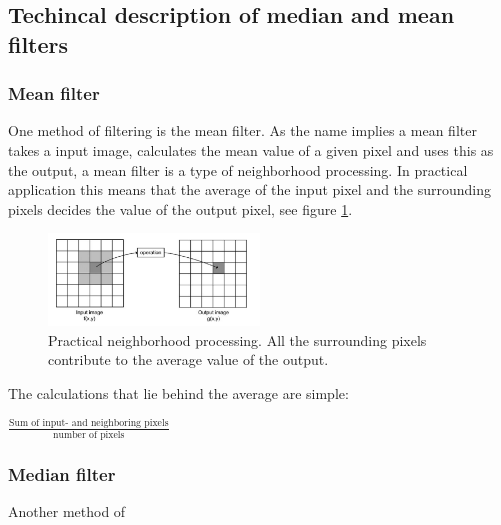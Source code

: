 \subsection{Techincal description of median and mean filters}

\subsubsection{Mean filter}
One method of filtering is the mean filter. As the name implies a mean filter takes a input image, calculates the mean value of a given pixel and uses this as the output, a mean filter is a type of neighborhood processing. In practical application this means that the average of the input pixel and the surrounding pixels decides the value of the output pixel, see figure \ref{fig:neigh_pros}.

\begin{figure}[htbp] 
\centering 
\includegraphics[width=0.5\textwidth]{Pictures/Theory/neighborhood_processing.png} 
\caption{Practical neighborhood processing. All the surrounding pixels contribute to the average value of the output.} 
\label{fig:neigh_pros} 
\end{figure}

The calculations that lie behind the average are simple:

$
\frac{\text{Sum of input- and neighboring pixels}}{\text{number of pixels}}
$

\subsubsection{Median filter}
Another method of 